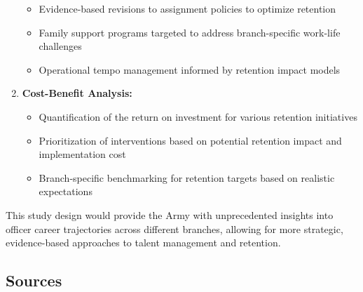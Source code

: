 \documentclass[./main.tex]{subfiles}
\providecommand{\tightlist}{%
  \setlength{\itemsep}{0pt}\setlength{\parskip}{0pt}}
\begin{document}
\begin{enumerate}
  \begin{itemize}
  \tightlist
  \item
    Evidence-based revisions to assignment policies to optimize
    retention
  \item
    Family support programs targeted to address branch-specific
    work-life challenges
  \item
    Operational tempo management informed by retention impact models
  \end{itemize}
\item
  \textbf{Cost-Benefit Analysis:}

  \begin{itemize}
  \tightlist
  \item
    Quantification of the return on investment for various retention
    initiatives
  \item
    Prioritization of interventions based on potential retention impact
    and implementation cost
  \item
    Branch-specific benchmarking for retention targets based on
    realistic expectations
  \end{itemize}
\end{enumerate}

This study design would provide the Army with unprecedented insights
into officer career trajectories across different branches, allowing for
more strategic, evidence-based approaches to talent management and
retention.

\subsection{Sources}\label{sources}
\end{document}
